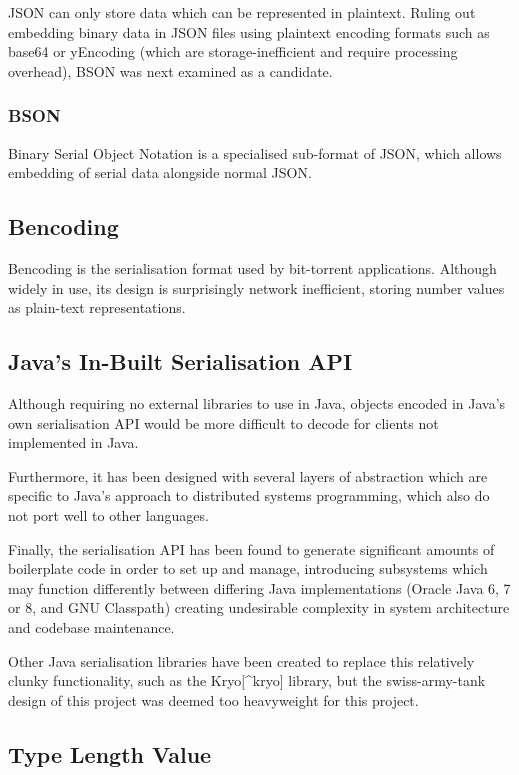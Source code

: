 \documentclass[12pt,a4paper,]{adreport}
\begin{document}
JSON can only store data which can be represented in plaintext. Ruling
out embedding binary data in JSON files using plaintext encoding formats
such as base64 or yEncoding (which are storage-inefficient and require
processing overhead), BSON was next examined as a candidate.

\subsubsection{BSON}\label{bson}

Binary Serial Object Notation is a specialised sub-format of JSON, which
allows embedding of serial data alongside normal JSON.

\subsection{Bencoding}\label{bencoding}

Bencoding is the serialisation format used by bit-torrent applications.
Although widely in use, its design is surprisingly network inefficient,
storing number values as plain-text representations.

\subsection{Java's In-Built Serialisation
API}\label{javas-in-built-serialisation-api}

Although requiring no external libraries to use in Java, objects encoded
in Java's own serialisation API would be more difficult to decode for
clients not implemented in Java.

Furthermore, it has been designed with several layers of abstraction
which are specific to Java's approach to distributed systems
programming, which also do not port well to other languages.

Finally, the serialisation API has been found to generate significant
amounts of boilerplate code in order to set up and manage, introducing
subsystems which may function differently between differing Java
implementations (Oracle Java 6, 7 or 8, and GNU Classpath) creating
undesirable complexity in system architecture and codebase maintenance.

Other Java serialisation libraries have been created to replace this
relatively clunky functionality, such as the Kryo{[}\^{}kryo{]} library,
but the swiss-army-tank design of this project was deemed too
heavyweight for this project.

\subsection{Type Length Value}\label{type-length-value}
\end{document}
